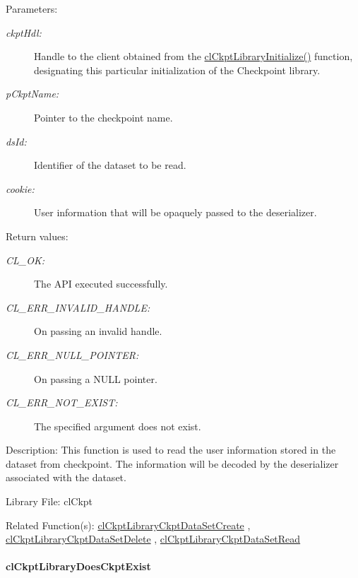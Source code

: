 \begin{Desc}
\item[Parameters:]
\begin{description}
\item[{\em ckpt\-Hdl:}]Handle to the client obtained from the \hyperlink{group__group10_ga2}{cl\-Ckpt\-Library\-Initialize()} function, designating this particular initialization of the Checkpoint library. \item[{\em p\-Ckpt\-Name:}]Pointer to the checkpoint name. \item[{\em ds\-Id:}]Identifier of the dataset to be read. \item[{\em cookie:}]User information that will be opaquely passed to the deserializer.\end{description}
\end{Desc}
\begin{Desc}
\item[Return values:]
\begin{description}
\item[{\em CL\_\-OK:}]The API executed successfully. \item[{\em CL\_\-ERR\_\-INVALID\_\-HANDLE:}]On passing an invalid handle. \item[{\em CL\_\-ERR\_\-NULL\_\-POINTER:}]On passing a NULL pointer. \item[{\em CL\_\-ERR\_\-NOT\_\-EXIST:}]The specified argument does not exist.\end{description}
\end{Desc}
\begin{Desc}
\item[Description:]This function is used to read the user information stored in the dataset from checkpoint. The information will be decoded by the deserializer associated with the dataset.\end{Desc}
\begin{Desc}
\item[Library File:]cl\-Ckpt\end{Desc}
\begin{Desc}
\item[Related Function(s):]\hyperlink{group__group10}{cl\-Ckpt\-Library\-Ckpt\-Data\-Set\-Create} , \hyperlink{group__group10}{cl\-Ckpt\-Library\-Ckpt\-Data\-Set\-Delete} , \hyperlink{group__group10}{cl\-Ckpt\-Library\-Ckpt\-Data\-Set\-Read} \end{Desc}
\hypertarget{pageckpt209}{}\paragraph{cl\-Ckpt\-Library\-Does\-Ckpt\-Exist}\label{pageckpt209}
